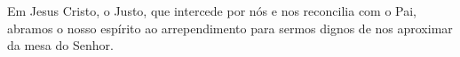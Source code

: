 Em Jesus Cristo, o Justo, que intercede por nós e nos reconcilia com o Pai, abramos o nosso espírito ao arrependimento para sermos dignos de nos aproximar da mesa do Senhor.
